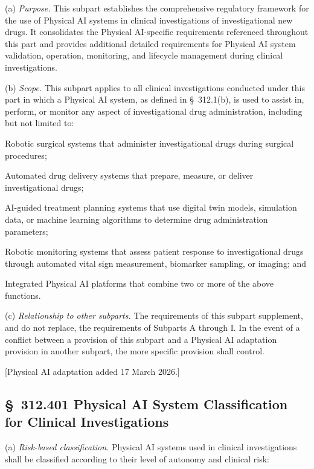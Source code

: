 \documentclass[11pt]{article}
\begin{document}
(a) \textit{Purpose.} This subpart establishes the comprehensive regulatory framework for the use of Physical AI systems in clinical investigations of investigational new drugs. It consolidates the Physical AI-specific requirements referenced throughout this part and provides additional detailed requirements for Physical AI system validation, operation, monitoring, and lifecycle management during clinical investigations.

(b) \textit{Scope.} This subpart applies to all clinical investigations conducted under this part in which a Physical AI system, as defined in \S~312.1(b), is used to assist in, perform, or monitor any aspect of investigational drug administration, including but not limited to:

\begin{description}[leftmargin=0.8cm,style=sameline]
\item[(1)] Robotic surgical systems that administer investigational drugs during surgical procedures;
\item[(2)] Automated drug delivery systems that prepare, measure, or deliver investigational drugs;
\item[(3)] AI-guided treatment planning systems that use digital twin models, simulation data, or machine learning algorithms to determine drug administration parameters;
\item[(4)] Robotic monitoring systems that assess patient response to investigational drugs through automated vital sign measurement, biomarker sampling, or imaging; and
\item[(5)] Integrated Physical AI platforms that combine two or more of the above functions.
\end{description}

(c) \textit{Relationship to other subparts.} The requirements of this subpart supplement, and do not replace, the requirements of Subparts A through I. In the event of a conflict between a provision of this subpart and a Physical AI adaptation provision in another subpart, the more specific provision shall control.

[Physical AI adaptation added 17 March 2026.]

\subsection{\S~312.401 Physical AI System Classification for Clinical Investigations}

(a) \textit{Risk-based classification.} Physical AI systems used in clinical investigations shall be classified according to their level of autonomy and clinical risk:
\end{document}
